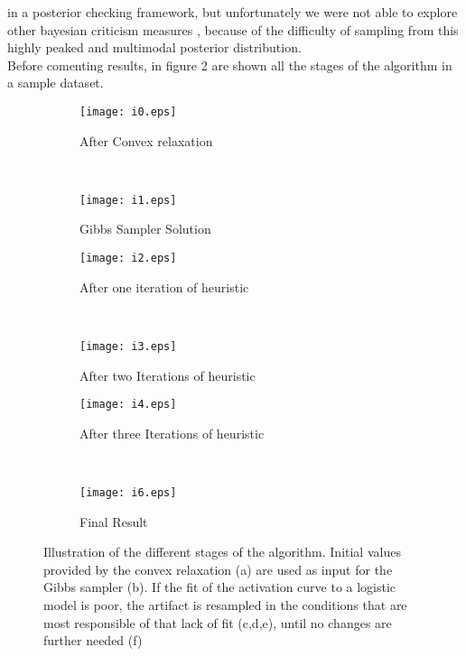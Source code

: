 

 \cite{Gelman96posteriorpredictive} in a posterior checking framework, but unfortunately we were not able to explore other bayesian criticism measures \cite{Box1980}, because of the difficulty of sampling from this highly peaked and multimodal posterior distribution. 
\\Before comenting results, in figure 2 are shown all the stages of the algorithm in a sample dataset.
\pagebreak 
   \begin{figure}[ht!]
        \centering
        \begin{subfigure}[b]{0.5\textwidth}
                \texttt{[image: i0.eps]}
                \caption{After Convex relaxation}
                \label{fig:gull}
        \end{subfigure}%
~\begin{subfigure}[b]{0.5\textwidth}
                \texttt{[image: i1.eps]}
                \caption{Gibbs Sampler Solution}
                \label{fig:tiger}
        \end{subfigure}
 
        \begin{subfigure}[b]{0.5\textwidth}
                \texttt{[image: i2.eps]}
                \caption{After one iteration of heuristic}
        \end{subfigure}~
         \begin{subfigure}[b]{0.5\textwidth}
                \texttt{[image: i3.eps]}
                \caption{After two Iterations of heuristic}
                \label{fig:mouse}
        \end{subfigure}
        
        
        \begin{subfigure}[b]{0.5\textwidth}
                \texttt{[image: i4.eps]}
                \caption{After three Iterations of heuristic}
        \end{subfigure}~
         \begin{subfigure}[b]{0.5\textwidth}
                \texttt{[image: i6.eps]}
                \caption{Final Result}
                \label{fig:mouse}
        \end{subfigure}
\caption{Illustration of the different stages of the algorithm. Initial values provided by the convex relaxation (a) are used as input for the Gibbs sampler (b). If the fit of the activation curve to a logistic model is poor, the artifact is resampled in the conditions that are most responsible of that lack of fit (c,d,e), until no changes are further needed (f)}
\end{figure}


